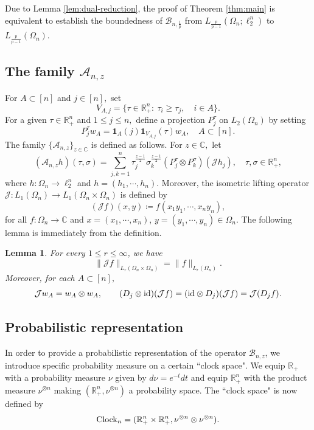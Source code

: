 \documentclass{amsart}
\numberwithin{equation}{section}
\newtheorem{lem}[thm]{Lemma}
\theoremstyle{definition}
\theoremstyle{remark}
\newcommand{\1}{\mathbf 1}
\begin{document}
Due to Lemma \ref{lem:dual-reduction}, the proof of Theorem \ref{thm:main} is equivalent to establish the boundedness of $\mathcal{B}_{n,\frac{1}{p}}$ from $L_{\frac{p}{p-1}}(\Omega_n;\ell^{n}_{2})$ to $L_{\frac{p}{p-1}}(\Omega_n)$.

\subsection{The family $\mathcal{A}_{n,z}$}

For $A\subset [n]$ and $j\in [n],$ set
$$V_{A,j}=\{\tau\in\mathbb{R}^n_+:\ \tau_i\geq \tau_j,\quad i\in A\}.$$
For a given $\tau\in \mathbb{R}^{n}_{+}$ and $1\leq j\leq n,$ define a projection $P_j^{\tau}$ on $L_2(\Omega_n)$ by setting
$$P_j^{\tau}w_A=\1_A(j)\1_{V_{A,j}}(\tau)w_A,\quad A\subset  [n].$$
The family $\{\mathcal{A}_{n,z}\}_{z\in \mathbb{C}}$ is defined as follows. For $z\in\mathbb{C},$ let
\begin{equation*}
(\mathcal{A}_{n,z}h)(\tau,\sigma)
 =\sum_{j,k=1}^{n}
 \tau_j^{\frac{z-1}{2}}\sigma_k^{\frac{z-1}{2}}
 (P_j^\tau\otimes P_k^{\sigma})(\mathcal{J}h_j),\quad \tau,\sigma\in\mathbb{R}^n_+,
\end{equation*}
where $h:\Omega_n\to \ell ^n_2$ and $h=(h_1,\cdots,h_n)$. Moreover, the isometric lifting operator $\mathcal{J}:L_1(\Omega_{n})\to L_1(\Omega_{n}\times \Omega_{n})$ is defined by
\begin{equation*}
(\mathcal{J}f)(x,y)\coloneqq f(x_{1}y_{1},\cdots, x_{n}y_{n}),
\end{equation*}
for all $f:\Omega_{n}\to \mathbb{C}$ and $x=(x_{1},\cdots,x_{n})$, $y=(y_{1},\cdots, y_{n})\in \Omega_{n}$. The following lemma is immediately from the definition.
\begin{lem}\label{lem:J}
For every $1\leq r\leq\infty$, we have
\begin{equation*}
 \|\mathcal{J}f\|_{L_{r}(\Omega_{n}\times \Omega_{n})}=\|f\|_{L_{r}(\Omega_{n})}.
\end{equation*}
Moreover, for each $A\subset [n],$
$$\mathcal{J}w_A=w_A\otimes w_A,\qquad (D_j\otimes{\rm id})(\mathcal{J}f)=({\rm id}\otimes D_j)(\mathcal{J}f)=\mathcal{J}(D_jf).$$
\end{lem}

\subsection{Probabilistic representation}

In order to provide a probabilistic representation of the operator $\mathcal{B}_{n,z}$, we introduce specific probability measure on a certain ``clock space". We equip $\mathbb{R}_+$ with a probability measure $\nu$ given by $d\nu=e^{-t}dt$ and equip $\mathbb{R}^n_+$ with the product measure $\nu^{\otimes n}$ making $(\mathbb{R}^n_+,\nu^{\otimes n})$ a probability space. The ``clock space" is now defined by
$${\rm Clock}_n=(\mathbb{R}^n_+\times\mathbb{R}^n_+,\nu^{\otimes n}\otimes\nu^{\otimes n}).$$
\end{document}
